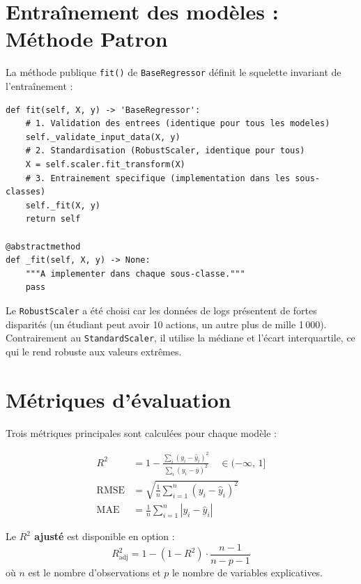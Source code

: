 \documentclass[12pt, a4paper, french]{report}
\begin{document}
\section{Entraînement des modèles : Méthode Patron}

La méthode publique \texttt{fit()} de \texttt{BaseRegressor} définit
le squelette invariant de l'entraînement :

\begin{lstlisting}[caption={Template Method dans BaseRegressor}]
def fit(self, X, y) -> 'BaseRegressor':
    # 1. Validation des entrees (identique pour tous les modeles)
    self._validate_input_data(X, y)
    # 2. Standardisation (RobustScaler, identique pour tous)
    X = self.scaler.fit_transform(X)
    # 3. Entrainement specifique (implementation dans les sous-classes)
    self._fit(X, y)
    return self

@abstractmethod
def _fit(self, X, y) -> None:
    """A implementer dans chaque sous-classe."""
    pass
\end{lstlisting}

Le \texttt{RobustScaler} a été choisi car les données de logs présentent de fortes disparités (un étudiant peut avoir 10 actions, un autre plus de mille 1\,000).
Contrairement au \texttt{StandardScaler}, il utilise la médiane et l'écart interquartile, ce qui le rend robuste aux valeurs extrêmes.

\section{Métriques d'évaluation}

Trois métriques principales sont calculées pour chaque modèle :

\begin{align}
  R^2 &= 1 - \frac{\sum_i (y_i - \hat{y}_i)^2}{\sum_i (y_i - \bar{y})^2}
         \quad \in (-\infty,\, 1]\\[6pt]
  \text{RMSE} &= \sqrt{\frac{1}{n}\sum_{i=1}^{n}(y_i - \hat{y}_i)^2}\\[6pt]
  \text{MAE}  &= \frac{1}{n}\sum_{i=1}^{n}\left|y_i - \hat{y}_i\right|
\end{align}

Le \textbf{$R^2$ ajusté} est disponible en option :
\begin{equation}
  R^2_{\text{adj}} = 1 - (1-R^2)\cdot\frac{n-1}{n-p-1}
\end{equation}
où $n$ est le nombre d'observations et $p$ le nombre de variables explicatives.
\end{document}
